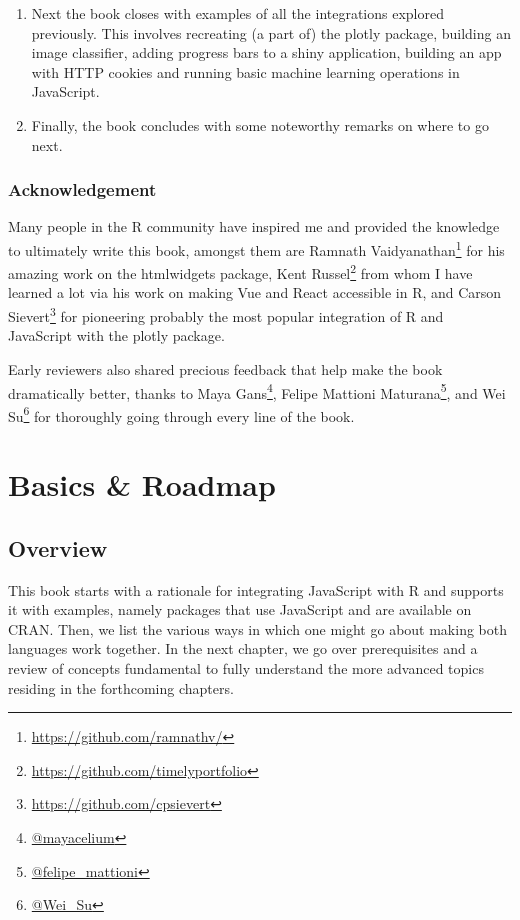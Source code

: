 \documentclass[
]{krantz}
\renewcommand{\href}[2]{#2\footnote{\url{#1}}}
\begin{document}
\begin{enumerate}
\item
  Next the book closes with examples of all the integrations explored previously. This involves recreating (a part of) the plotly package, building an image classifier, adding progress bars to a shiny application, building an app with HTTP cookies and running basic machine learning operations in JavaScript.
\item
  Finally, the book concludes with some noteworthy remarks on where to go next.
\end{enumerate}

\hypertarget{acknowledgement}{%
\section*{Acknowledgement}\label{acknowledgement}}


Many people in the R community have inspired me and provided the knowledge to ultimately write this book, amongst them are \href{https://github.com/ramnathv/}{Ramnath Vaidyanathan} for his amazing work on the htmlwidgets \citep{R-htmlwidgets} package, \href{https://github.com/timelyportfolio}{Kent Russel} from whom I have learned a lot via his work on making Vue and React accessible in R, and \href{https://github.com/cpsievert}{Carson Sievert} for pioneering probably the most popular integration of R and JavaScript with the plotly \citep{R-plotly} package.

Early reviewers also shared precious feedback that help make the book dramatically better, thanks to \href{@mayacelium}{Maya Gans}, \href{@felipe_mattioni}{Felipe Mattioni Maturana}, and \href{@Wei_Su}{Wei Su} for thoroughly going through every line of the book.

\mainmatter

\hypertarget{part-basics-roadmap}{%
\part{Basics \& Roadmap}\label{part-basics-roadmap}}

\hypertarget{intro-overview}{%
\chapter{Overview}\label{intro-overview}}

This book starts with a rationale for integrating JavaScript with R and supports it with examples, namely packages that use JavaScript and are available on CRAN. Then, we list the various ways in which one might go about making both languages work together. In the next chapter, we go over prerequisites and a review of concepts fundamental to fully understand the more advanced topics residing in the forthcoming chapters.
\end{document}

